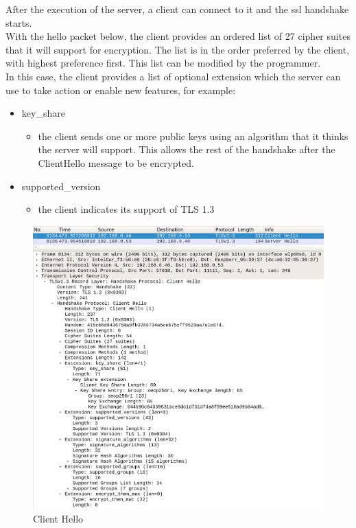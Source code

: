 \documentclass[a4paper,12pt]{report}
\begin{document}
After the execution of the server, a client can connect to it and the ssl handshake starts.
\\With the hello packet below, the client provides an ordered list of 27 cipher suites that it will support for encryption. The list is in the order preferred by the client, with highest preference first. This list can be modified by the programmer.
\\In this case, the client provides a list of optional extension which the server can use to take action or enable new features, for example:
\begin{itemize}
\item key\_share 
\begin{itemize}
\item the client sends one or more public keys using an algorithm that it thinks the server will support. This allows the rest of the handshake after the ClientHello message to be encrypted.
\end{itemize}
\item supported\_version
\begin{itemize}
\item the client indicates its support of TLS 1.3
\end{itemize}
\end{itemize}
\begin{figure}[H]
    \centering
    \includegraphics[scale=0.248]{./code/img/client-hello.png}
    \caption{Client Hello}
    \label{fig:galaxy}
\end{figure}
\end{document}
